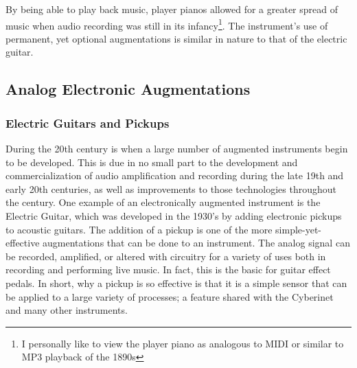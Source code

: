 By being able to play back music, player pianos allowed for a greater spread of music when audio recording was still in its infancy\footnote{I personally like to view the player piano as analogous to MIDI or similar to MP3 playback of the 1890s}. The instrument's use of permanent, yet optional augmentations is similar in nature to that of the electric guitar.



\subsection{Analog Electronic Augmentations}

\subsubsection{Electric Guitars and Pickups}
During the 20th century is when a large number of augmented instruments begin to be developed. This is due in no small part to the development and commercialization of audio amplification and recording during the late 19th and early 20th centuries, as well as improvements to those technologies throughout the century. One example of an electronically augmented instrument is the Electric Guitar, which was developed in the 1930's by adding electronic pickups to acoustic guitars\cite{electric_guit_history}. The addition of a pickup is one of the more simple-yet-effective augmentations that can be done to an instrument. The analog signal can be recorded, amplified, or altered with circuitry for a variety of uses both in recording and performing live music. In fact, this is the basic for guitar effect pedals. In short, why a pickup is so effective is that it is a simple sensor that can be applied to a large variety of processes; a feature shared with the Cyberinet and many other instruments.





